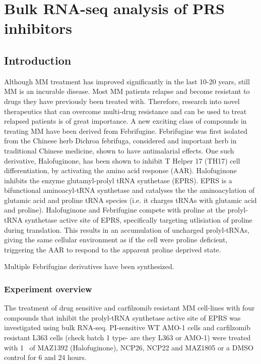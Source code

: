 \chapter{\label{ch:5-bulk}Bulk RNA-seq analysis of PRS inhibitors}


\section{Introduction}
Although MM treatment has improved significantly in the last 10-20 years, still MM is an incurable disease.
Most MM patients relapse and become resistant to drugs they have previously been treated with.
Therefore, research into novel therapeutics that can overcome multi-drug resistance and can be used to treat relapsed patients is of great importance.
A new exciting class of compounds in treating MM have been derived from Febrifugine.
Febrifugine was first isolated from the Chinese herb Dichroa febrifuga, considered and important herb in traditional Chinese medicine, shown to have antimalarial effects.
One such derivative, Halofuginone, has been shown to inhibit T Helper 17 (TH17) cell differentiation, by activating the amino acid response (AAR)\cite{sundrud2009halofuginone}.
Halofuginone inhibits the enzyme glutamyl-prolyl tRNA synthetase (EPRS).
EPRS is a bifunctional aminoacyl-tRNA synthetase and catalyses the the aminoacylation of glutamic acid and proline tRNA species (i.e. it charges tRNAs with glutamic acid and proline).
Halofuginone and Febrifugine compete with proline at the prolyl-tRNA synthetase active site of EPRS, specifically targeting utlisiation of proline during translation\cite{keller2012halofuginone}.
This results in an accumulation of uncharged prolyl-tRNAs, giving the same cellular environment as if the cell were proline deficient, triggering the AAR to respond to the apparent proline deprived state.

Multiple Febrifugine derivatives have been synthesized.

\subsection{Experiment overview}
The treatment of drug sensitive and carfilzomib resistant MM cell-lines with four compounds that inhibit  the  prolyl-tRNA  synthetase  active  site  of  EPRS  was investigated using bulk RNA-seq.
PI-sensitive WT AMO-1 cells and carfilzomib resistant L363 cells (check batch 1 type- are they L363 or AMO-1) were treated with 1\si{\micro\Molar} of MAZ1392 (Halofuginone), NCP26, NCP22 and MAZ1805 or a DMSO control for 6 and 24 hours.

